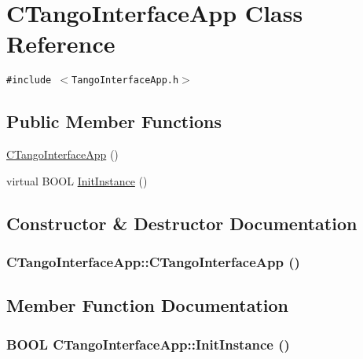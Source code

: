 \hypertarget{classCTangoInterfaceApp}{
\section{CTangoInterfaceApp Class Reference}
\label{classCTangoInterfaceApp}
}
{\tt \#include $<$TangoInterfaceApp.h$>$}

\subsection*{Public Member Functions}
\begin{CompactItemize}
\item 
\hyperlink{classCTangoInterfaceApp_e1aaadbba6f66b517068a5ec68ea344e}{CTangoInterfaceApp} ()
\item 
virtual BOOL \hyperlink{classCTangoInterfaceApp_1e4456db86ea4dfa641d244a7715b4f6}{InitInstance} ()
\end{CompactItemize}


\subsection{Constructor \& Destructor Documentation}
\hypertarget{classCTangoInterfaceApp_e1aaadbba6f66b517068a5ec68ea344e}{
\subsubsection[CTangoInterfaceApp]{\setlength{\rightskip}{0pt plus 5cm}CTangoInterfaceApp::CTangoInterfaceApp ()}}
\label{classCTangoInterfaceApp_e1aaadbba6f66b517068a5ec68ea344e}




\subsection{Member Function Documentation}
\hypertarget{classCTangoInterfaceApp_1e4456db86ea4dfa641d244a7715b4f6}{
\subsubsection[InitInstance]{\setlength{\rightskip}{0pt plus 5cm}BOOL CTangoInterfaceApp::InitInstance ()}}
\label{classCTangoInterfaceApp_1e4456db86ea4dfa641d244a7715b4f6}




